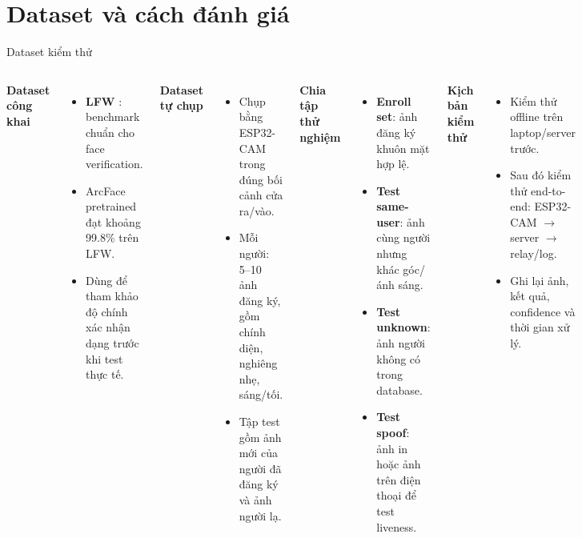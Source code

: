 \documentclass[aspectratio=169]{beamer}
\begin{document}
\section{Dataset và cách đánh giá}

\begin{frame}{Dataset kiểm thử}
  \footnotesize
  \begin{columns}[T]
      \textbf{Dataset công khai}
      \begin{itemize}\setlength{\itemsep}{0.25em}
        \item \textbf{LFW} \cite{lfw}: benchmark chuẩn cho face verification.
        \item ArcFace pretrained đạt khoảng 99.8\% trên LFW.
        \item Dùng để tham khảo độ chính xác nhận dạng trước khi test thực tế.
      \end{itemize}

      \vspace{0.35em}
      \textbf{Dataset tự chụp}
      \begin{itemize}\setlength{\itemsep}{0.25em}
        \item Chụp bằng ESP32-CAM trong đúng bối cảnh cửa ra/vào.
        \item Mỗi người: 5--10 ảnh đăng ký, gồm chính diện, nghiêng nhẹ, sáng/tối.
        \item Tập test gồm ảnh mới của người đã đăng ký và ảnh người lạ.
      \end{itemize}

      \textbf{Chia tập thử nghiệm}
      \begin{itemize}\setlength{\itemsep}{0.25em}
        \item \textbf{Enroll set}: ảnh đăng ký khuôn mặt hợp lệ.
        \item \textbf{Test same-user}: ảnh cùng người nhưng khác góc/ánh sáng.
        \item \textbf{Test unknown}: ảnh người không có trong database.
        \item \textbf{Test spoof}: ảnh in hoặc ảnh trên điện thoại để test liveness.
      \end{itemize}

      \vspace{0.35em}
      \textbf{Kịch bản kiểm thử}
      \begin{itemize}\setlength{\itemsep}{0.25em}
        \item Kiểm thử offline trên laptop/server trước.
        \item Sau đó kiểm thử end-to-end: ESP32-CAM $\to$ server $\to$ relay/log.
        \item Ghi lại ảnh, kết quả, confidence và thời gian xử lý.
      \end{itemize}
  \end{columns}
\end{frame}
\end{document}
